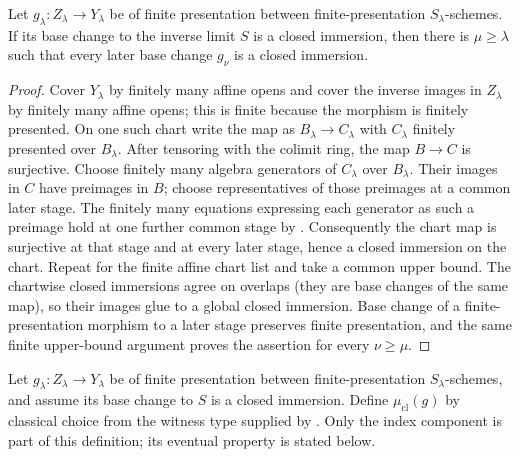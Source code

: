 \begin{lemma}
  \label{lemma:nagata-closed-immersion-stage-exists}

  Let $g_\lambda\colon Z_\lambda\to Y_\lambda$ be of finite presentation
  between finite-presentation $S_\lambda$-schemes.  If its base change to the
  inverse limit $S$ is a closed immersion, then there is
  $\mu\geq\lambda$ such that every later base change $g_\nu$ is a closed
  immersion.
\end{lemma}

\begin{proof}
  Cover $Y_\lambda$ by finitely many affine opens and cover the inverse images
  in $Z_\lambda$ by finitely many affine opens; this is finite because the
  morphism is finitely presented.  On one such chart write the map as
  $B_\lambda\to C_\lambda$ with $C_\lambda$ finitely presented over
  $B_\lambda$.  After tensoring with the colimit ring, the map
  $B\to C$ is surjective.  Choose finitely many algebra generators of
  $C_\lambda$ over $B_\lambda$.  Their images in $C$ have preimages in $B$;
  choose representatives of those preimages at a common later stage.  The
  finitely many equations expressing each generator as such a preimage hold
  at one further common stage by
  .  Consequently the chart
  map is surjective at that stage and at every later stage, hence a closed
  immersion on the chart.  Repeat for the finite affine chart list and take a
  common upper bound.  The chartwise closed immersions agree on overlaps (they
  are base changes of the same map), so their images glue to a global closed
  immersion.  Base change of a finite-presentation morphism to a later stage
  preserves finite presentation, and the same finite upper-bound argument
  proves the assertion for every $\nu\geq\mu$.
\end{proof}

\begin{definition}
  \label{def:nagata-closed-immersion-stage}

  Let $g_\lambda\colon Z_\lambda\to Y_\lambda$ be of finite presentation
  between finite-presentation $S_\lambda$-schemes, and assume its base change
  to $S$ is a closed immersion.  Define $\mu_{\mathrm{cl}}(g)$ by classical
  choice from the witness type supplied by
  .  Only the index component
  is part of this definition; its eventual property is stated below.
\end{definition}

